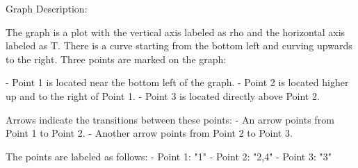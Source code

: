 Graph Description:

The graph is a plot with the vertical axis labeled as rho and the horizontal axis labeled as T. There is a curve starting from the bottom left and curving upwards to the right. Three points are marked on the graph:

- Point 1 is located near the bottom left of the graph.
- Point 2 is located higher up and to the right of Point 1.
- Point 3 is located directly above Point 2.

Arrows indicate the transitions between these points:
- An arrow points from Point 1 to Point 2.
- Another arrow points from Point 2 to Point 3.

The points are labeled as follows:
- Point 1: "1"
- Point 2: "2,4"
- Point 3: "3"